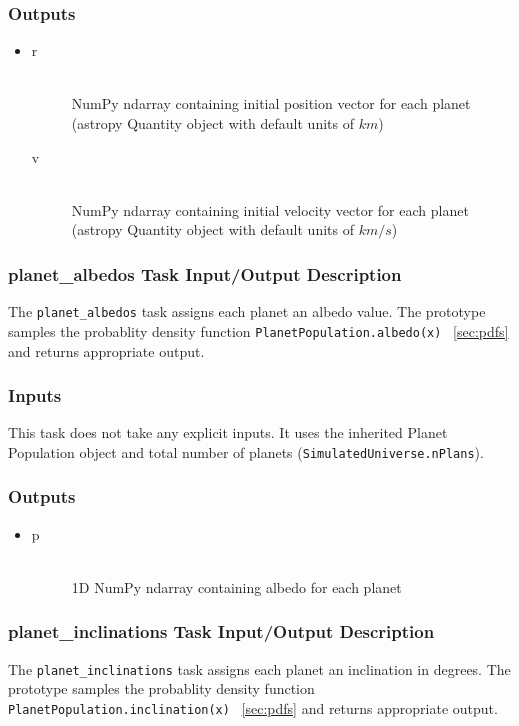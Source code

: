 \documentclass[cleanfoot]{asme2ej}
\begin{document}
\subsubsection*{Outputs}
\begin{itemize}
    \item 
    \begin{description}
        \item[r] \hfill \\
        NumPy ndarray containing initial position vector for each planet (astropy Quantity object with default units of $ km $)
        \item[v] \hfill \\
        NumPy ndarray containing initial velocity vector for each planet (astropy Quantity object with default units of $ km/s $)
    \end{description}
\end{itemize}

\subsubsection{planet\_albedos Task Input/Output Description} \label{sec:planetalbedostask}
The \verb+planet_albedos+ task assigns each planet an albedo value. The prototype samples the probablity density function \verb+PlanetPopulation.albedo(x)+ ~\ref{sec:pdfs} and returns appropriate output.

\subsubsection*{Inputs}
This task does not take any explicit inputs.  It uses the inherited Planet Population object and total number of planets (\verb+SimulatedUniverse.nPlans+).

\subsubsection*{Outputs}
\begin{itemize}
    \item 
    \begin{description}
        \item[p] \hfill \\
        1D NumPy ndarray containing albedo for each planet 
    \end{description}
\end{itemize}

\subsubsection{planet\_inclinations Task Input/Output Description} \label{sec:planetinclinationstask}
The \verb+planet_inclinations+ task assigns each planet an inclination in degrees. The prototype samples the probablity density function \verb+PlanetPopulation.inclination(x)+ ~\ref{sec:pdfs} and returns appropriate output.
\end{document}
